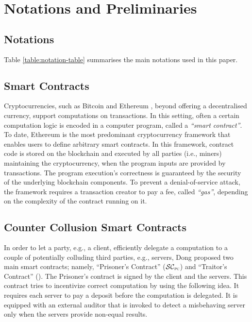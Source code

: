 


\section{Notations and Preliminaries}


\subsection{Notations}

Table \ref{table:notation-table} summarises the main notations used in this paper. 








\subsection{Smart Contracts}

Cryptocurrencies, such as Bitcoin \cite{bitcoin} and Ethereum \cite{ethereum}, beyond offering a decentralised currency,  support computations on transactions. In this setting, often a certain computation logic is encoded in a computer program, called a \emph{``smart contract''}. To date, Ethereum is the most predominant cryptocurrency framework that enables users to define arbitrary smart contracts. In this framework,  contract code is stored on the blockchain and executed by all parties (i.e., miners) maintaining the cryptocurrency,  when the program inputs are provided by transactions. The program execution's correctness is guaranteed by the security of the underlying blockchain components. To prevent a denial-of-service attack, the framework requires a transaction creator to pay a  fee, called \emph{``gas''}, depending on the complexity of the contract running on it. 

\subsection{Counter Collusion Smart Contracts}\label{Counter-Collusion-Smart-Contracts}

In order to let a party, e.g., a client, efficiently delegate a computation to a  couple of potentially colluding third parties, e.g., servers, Dong   \et \cite{dong2017betrayal} proposed two main smart contracts; namely, ``Prisoner's Contract'' ($\SCpc$) and ``Traitor's Contract'' (\SCtc).  
%
The Prisoner's contract is signed by the client and the servers. This contract tries to incentivize correct computation by using the following idea. It requires each server to pay a deposit before the computation is delegated. It is equipped with an external auditor that is invoked to detect a misbehaving server only when the servers provide non-equal results. 



